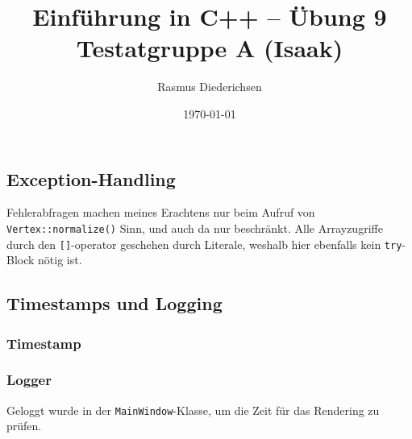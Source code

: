 \documentclass{article}
\title{Einführung in C++ -- Übung 9 \\ Testatgruppe A (Isaak)}
\author{Rasmus Diederichsen}
\date{\today}
\begin{document}
   \maketitle

   \setcounter{section}{9}

   \subsection{Exception-Handling}
   
   Fehlerabfragen machen meines Erachtens nur beim Aufruf von
   \texttt{Vertex::normalize()} Sinn, und auch da nur beschränkt. Alle
   Arrayzugriffe durch den \texttt{[]}-operator geschehen durch Literale,
   weshalb hier ebenfalls kein \texttt{try}-Block nötig ist.

   
   
   
   
   
   
   
   

   \subsection{Timestamps und Logging}
   
   \subsubsection*{Timestamp}
   
   

   \subsubsection*{Logger}
   
   

   Geloggt wurde in der \texttt{MainWindow}-Klasse, um die Zeit für das
   Rendering zu prüfen.
   
\end{document}
